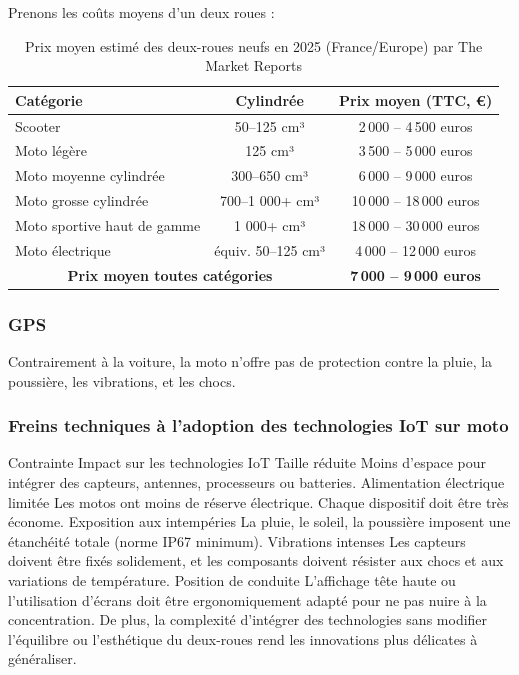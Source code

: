 Prenons les coûts moyens d'un deux roues :\\
\begin{table}[ht]
\centering
\begin{tabular}{|l|c|c|}
\hline
\textbf{Catégorie} & \textbf{Cylindrée} & \textbf{Prix moyen (TTC, €)} \\
\hline
Scooter & 50--125 cm³ & 2\,000 -- 4\,500 euros \\
Moto légère & 125 cm³ & 3\,500 -- 5\,000 euros \\
Moto moyenne cylindrée & 300--650 cm³ & 6\,000 -- 9\,000 euros \\
Moto grosse cylindrée & 700--1 000+ cm³ & 10\,000 -- 18\,000 euros \\
Moto sportive haut de gamme & 1 000+ cm³ & 18\,000 -- 30\,000 euros \\
Moto électrique & équiv. 50--125 cm³ & 4\,000 -- 12\,000 euros \\
\hline
\multicolumn{2}{|c|}{\textbf{Prix moyen toutes catégories}} & \textbf{7\,000 -- 9\,000 euros} \\
\hline
\end{tabular}
\caption{Prix moyen estimé des deux-roues neufs en 2025 (France/Europe) par The Market Reports}
\end{table}

\subsubsection{GPS}
Contrairement à la voiture, la moto n’offre pas de protection contre la pluie, la poussière, les vibrations, et les chocs.

\subsubsection{ Freins techniques à l’adoption des technologies IoT sur moto}
Contrainte	Impact sur les technologies IoT
Taille réduite	Moins d’espace pour intégrer des capteurs, antennes, processeurs ou batteries.
Alimentation électrique limitée	Les motos ont moins de réserve électrique. Chaque dispositif doit être très économe.
Exposition aux intempéries	La pluie, le soleil, la poussière imposent une étanchéité totale (norme IP67 minimum).
Vibrations intenses	Les capteurs doivent être fixés solidement, et les composants doivent résister aux chocs et aux variations de température.
Position de conduite	L’affichage tête haute ou l’utilisation d’écrans doit être ergonomiquement adapté pour ne pas nuire à la concentration.
De plus, la complexité d’intégrer des technologies sans modifier l’équilibre ou l’esthétique du deux-roues rend les innovations plus délicates à généraliser.


